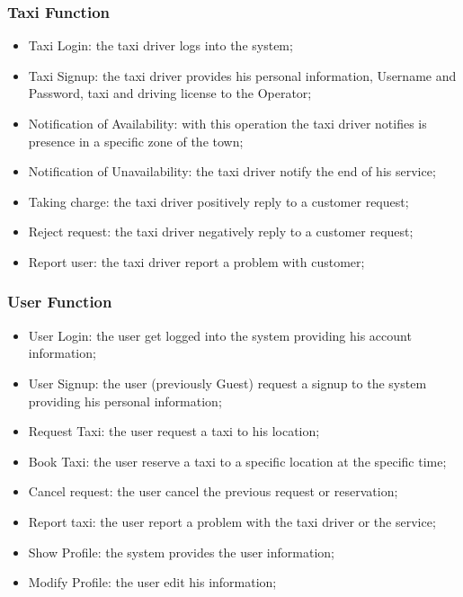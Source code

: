 \documentclass[english]{article}
\begin{document}
\subsubsection{Taxi Function}
\begin{itemize}
	\item Taxi Login: the taxi driver logs into the system;
	\item Taxi Signup: the taxi driver provides his personal information, Username and Password, taxi  and driving license to the Operator;
	\item Notification of Availability: with this operation the taxi driver notifies is presence in a specific zone of the town;
	\item Notification of Unavailability: the taxi driver notify the end of his service;
	\item Taking charge: the taxi driver positively reply to a customer request;
	\item Reject request: the taxi driver negatively reply to a customer request;
	\item Report user: the taxi driver report a problem with customer;
\end{itemize}

\subsubsection{User Function}
\begin{itemize}
	\item User Login: the user get logged into the system providing his account information;
	\item User Signup: the user (previously Guest) request a signup to the system providing his personal information;
	\item Request Taxi: the user request a taxi to his location;
	\item Book Taxi: the user reserve a taxi to a specific location at the specific time;
	\item Cancel request: the user cancel the previous request or reservation;
	\item Report taxi: the user report a problem with the taxi driver or the service;
	\item Show Profile: the system provides the user information;
	\item Modify Profile: the user edit his information;
\end{itemize}
\end{document}
